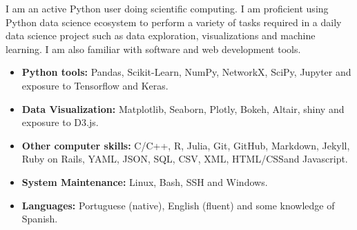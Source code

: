 \documentclass[12pt,a4paper,sans]{moderncv}        %
\begin{document}
\vspace{6pt}
I am an active Python user doing scientific computing. I am proficient using Python data science ecosystem to perform a variety of tasks required in a daily data science project such as data exploration, visualizations and machine learning. I am also familiar with software and web development tools. 
\vspace{6pt}
\begin{itemize}

\item \textbf{Python tools:} Pandas, Scikit-Learn, NumPy, NetworkX, SciPy, Jupyter and exposure to Tensorflow and Keras.

\vspace{6pt}

\item \textbf{Data Visualization:} Matplotlib, Seaborn, Plotly, Bokeh, Altair, shiny and exposure to D3.js.

\vspace{6pt}

\item \textbf{Other computer skills:} C/C++, R, Julia, Git, GitHub, Markdown, Jekyll, Ruby on Rails, YAML, JSON, SQL, CSV, XML, HTML/CSSand  Javascript.

\vspace{6pt}

\item \textbf{System Maintenance:} Linux, Bash, SSH and Windows.

\vspace{6pt}

\item \textbf{Languages:} Portuguese (native), English (fluent) and some knowledge of Spanish.

\end{itemize}
\end{document}
